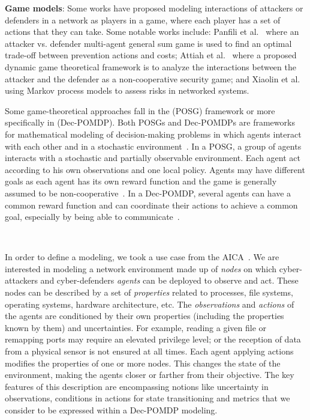 \noindent
\textbf{Game models}: \quad Some works have proposed modeling interactions of attackers or defenders in a network as players in a game, where each player has a set of actions that they can take.
Some notable works include: Panfili et al.~\cite{MPanfili2018} where an attacker vs. defender multi-agent general sum game is used to find an optimal trade-off between prevention actions and costs; Attiah et al.~\cite{AAttiah2018} where a proposed dynamic game theoretical framework is to analyze the interactions between the attacker and the defender as a non-cooperative security game; and Xiaolin et al.~\cite{CXiaolin2008} using Markov process models to assess risks in networked systems.

\noindent
Some game-theoretical approaches fall in the  (POSG) framework or more specifically in  (Dec-POMDP). Both POSGs and Dec-POMDPs are frameworks for mathematical modeling of decision-making problems in which agents interact with each other and in a stochastic environment~\cite{beynier2010}. In a POSG, a group of agents interacts with a stochastic and partially observable environment. Each agent act according to his own observations and one local policy. Agents may have different goals as each agent has its own reward function and the game is generally assumed to be non-cooperative~\cite{jk2020}. In a Dec-POMDP, several agents can have a common reward function and can coordinate their actions to achieve a common goal, especially by being able to communicate~\cite{bernstein2013}.

\



\noindent
In order to define a modeling, we took a use case from the AICA~\cite{theron_autonomous_2021}. We are interested in modeling a network environment made up of \textit{nodes} on which cyber-attackers and cyber-defenders \textit{agents} can be deployed to observe and act. These nodes can be described by a set of \textit{properties} related to processes, file systems, operating systems, hardware architecture, etc.
The \textit{observations} and \textit{actions} of the agents are conditioned by their own properties (including the properties known by them) and uncertainties. For example, reading a given file or remapping ports may require an elevated privilege level; or the reception of data from a physical sensor is not ensured at all times.
Each agent applying actions modifies the properties of one or more nodes. This changes the state of the environment, making the agents closer or farther from their objective.
The key features of this description are encompassing notions like uncertainty in observations, conditions in actions for state transitioning and metrics that we consider to be expressed within a Dec-POMDP modeling.

